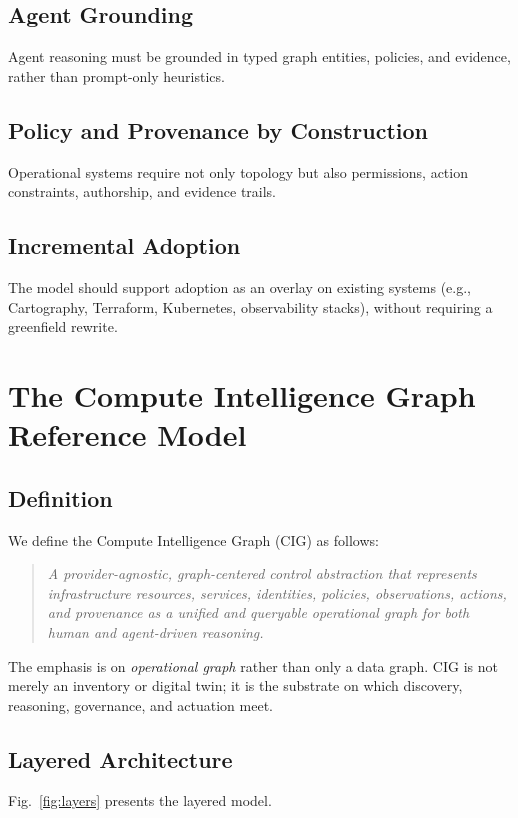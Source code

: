 \documentclass[conference]{IEEEtran}
\begin{document}
\subsection{Agent Grounding}
Agent reasoning must be grounded in typed graph entities, policies, and evidence, rather than prompt-only heuristics.

\subsection{Policy and Provenance by Construction}
Operational systems require not only topology but also permissions, action constraints, authorship, and evidence trails.

\subsection{Incremental Adoption}
The model should support adoption as an overlay on existing systems (e.g., Cartography, Terraform, Kubernetes, observability stacks), without requiring a greenfield rewrite.

\section{The Compute Intelligence Graph Reference Model}
\subsection{Definition}
We define the Compute Intelligence Graph (CIG) as follows:
\begin{quote}
\emph{A provider-agnostic, graph-centered control abstraction that represents infrastructure resources, services, identities, policies, observations, actions, and provenance as a unified and queryable operational graph for both human and agent-driven reasoning.}
\end{quote}

The emphasis is on \emph{operational graph} rather than only a data graph. CIG is not merely an inventory or digital twin; it is the substrate on which discovery, reasoning, governance, and actuation meet.

\subsection{Layered Architecture}
Fig.~\ref{fig:layers} presents the layered model.
\end{document}
